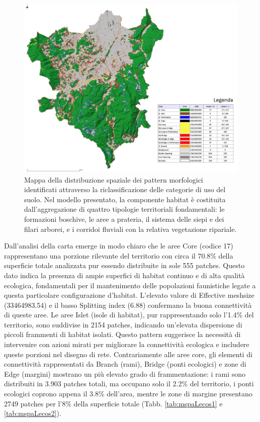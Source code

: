 \documentclass[
  a4paper,
]{book}
\begin{document}
\begin{figure}

{\centering \includegraphics[width=\linewidth]{./figs/mspa8211_relazione} 

}

\caption{Mappa della distribuzione spaziale dei pattern morfologici identificati attraverso la riclassificazione delle categorie di uso del suolo. Nel modello presentato, la componente habitat è  costituita dall'aggregazione di quattro tipologie territoriali fondamentali: le formazioni boschive, le aree a prateria, il sistema delle siepi e dei filari arborei, e i corridoi fluviali con la relativa vegetazione ripariale.}\label{fig:mspaAll}
\end{figure}

Dall'analisi della carta emerge in modo chiaro che le aree Core (codice 17) rappresentano una porzione rilevante del territorio con circa il 70.8\% della superficie totale analizzata pur essendo distribuite in sole 555 patches.
Questo dato indica la presenza di ampie superfici di habitat continuo e di alta qualità ecologica, fondamentali per il mantenimento delle popolazioni faunistiche legate a questa particolare configurazione d'habitat.
L'elevato valore di Effective meshsize (33464983.54) e il basso Splitting index (6.88) confermano la buona connettività di queste aree.
Le aree Islet (isole di habitat), pur rappresentando solo l'1.4\% del territorio, sono suddivise in 2154 patches, indicando un'elevata dispersione di piccoli frammenti di habitat isolati.
Questo pattern suggerisce la necessità di intervenire con azioni mirati per migliorare la connettività ecologica e includere queste porzioni nel disegno di rete.
Contrariamente alle aree core, gli elementi di connettività rappresentati da Branch (rami), Bridge (ponti ecologici) e zone di Edge (margini) mostrano un più elevato grado di frammentazione: i rami sono distribuiti in 3.903 patches totali, ma occupano solo il 2.2\% del territorio, i ponti ecologici coprono appena il 3.8\% dell'area, mentre le zone di margine presentano 2749 patches per l'8\% della superficie totale (Tabb. \ref{tab:mspaLecos1} e \ref{tab:mspaLecos2}).
\end{document}
